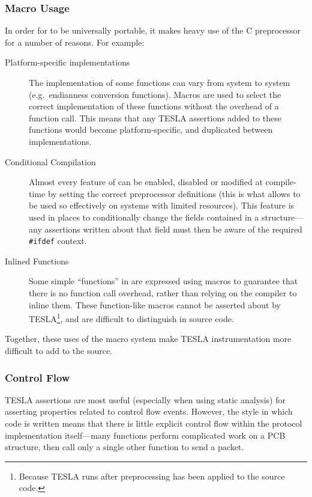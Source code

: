 \subsubsection{Macro Usage}

In order for \lwip{} to be universally portable, it makes heavy use of the
C preprocessor for a number of reasons. For example:
\begin{description}
  \item[Platform-specific implementations] The implementation of some
  functions can vary from system to system (e.g.\ endianness conversion
  functions). Macros are used to select the correct implementation of
  these functions without the overhead of a function call. This means
  that any TESLA assertions added to these functions would become
  platform-specific, and duplicated between implementations.

  \item[Conditional Compilation] Almost every feature of \lwip{} can be
  enabled, disabled or modified at compile-time by setting the correct
  preprocessor definitions (this is what allows \lwip{} to be used so
  effectively on systems with limited resources). This feature
  is used in places to conditionally change the fields contained in a
  structure---any assertions written about that field must then be aware
  of the required \texttt{#ifdef} context.

  \item[Inlined Functions] Some simple ``functions'' in \lwip{} are expressed using
    macros to guarantee that there is no function call overhead, rather than
    relying on the compiler to inline them. These function-like macros cannot be
    asserted about by TESLA\footnote{Because TESLA runs after preprocessing has
    been applied to the source code.}, and are difficult to distinguish in source code.
\end{description}

Together, these uses of the macro system make TESLA instrumentation more difficult to add
to the \lwip{} source.

\subsubsection{Control Flow}

TESLA assertions are most useful (especially when using static analysis)
for asserting properties related to control flow events. However, the
style in which \lwip{} code is written means that there is little explicit
control flow within the protocol implementation itself---many functions
perform complicated work on a PCB structure, then call only a single
other function to send a packet.

